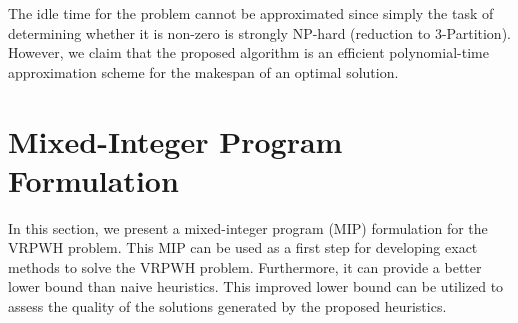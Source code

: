 \documentclass[12pt]{scrartcl}
\begin{document}
The idle time for the problem cannot be approximated since simply the task of determining whether it is non-zero is strongly NP-hard (reduction to $3$-Partition). However, we claim that the proposed algorithm is an efficient polynomial-time approximation scheme for the makespan of an optimal solution. \\
\fi


\iffalse
\section{Randomized Heuristic}
\subsection{Description}

\noindent A second heuristic for the VRPWH problem is the following:

\begin{enumerate}
    \item Compute the proportion $p = |V'|/|V|$ of service stops that can be handled by the helper vehicle.
    \item Identify the closest service stop that has not yet been serviced. There are now two cases to consider:
    \begin{enumerate}
        \item If $u\in V'$, then we have the option to handle $u$ with the helper mailman. We generate a $\mathcal{U}(0, 1)$ random variable. If $U \leq p$, then we handle $u$ with the helper vehicle, and we consider the remaining unserviced customers in non-decrasing order by their distance to $u$. We handle as many customers  as possible so that the helper vehicle has zero idle time (i.e., it will never be waiting at $u$ for the primary vehicle to come back).
        \item If $u \not \in V'$, then 
    \end{enumerate}
\end{enumerate}
\fi

\iffalse
\section{Mixed-Integer Program Formulation}
In this section, we present a mixed-integer program (MIP) formulation for the VRPWH problem. This MIP can be used as a first step for developing exact methods to solve the VRPWH problem. Furthermore, it can provide a better lower bound than naive heuristics. This improved lower bound can be utilized to assess the quality of the solutions generated by the proposed heuristics.  \\
\end{document}
